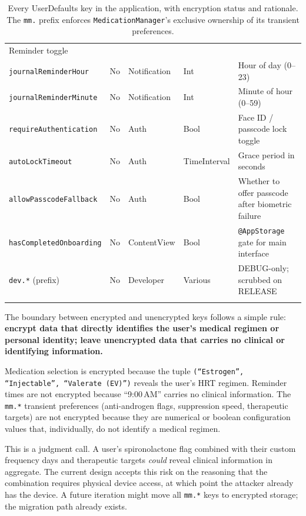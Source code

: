 \documentclass[11pt,a4paper]{article}
\newcommand{\code}[1]{\texttt{\small #1}}
\begin{document}
\begin{table}[h]
\begin{longtable}{@{}p{3.4cm}p{1.2cm}p{2.4cm}p{2.2cm}p{5.3cm}@{}}
  Reminder toggle \\
\code{journalReminderHour} & No & Notification & Int &
  Hour of day (0--23) \\
\code{journalReminderMinute} & No & Notification & Int &
  Minute of hour (0--59) \\
\midrule
\code{requireAuthentication} & No & Auth & Bool &
  Face ID / passcode lock toggle \\
\code{autoLockTimeout} & No & Auth & TimeInterval &
  Grace period in seconds \\
\code{allowPasscodeFallback} & No & Auth & Bool &
  Whether to offer passcode after biometric failure \\
\midrule
\code{hasCompletedOnboarding} & No & ContentView & Bool &
  \code{@AppStorage} gate for main interface \\
\code{dev.*} (prefix) & No & Developer & Various &
  DEBUG-only; scrubbed on RELEASE \\
\bottomrule
\caption{Every UserDefaults key in the application, with encryption status
and rationale. The \code{mm.} prefix enforces \code{MedicationManager}'s
exclusive ownership of its transient preferences.}
\label{tab:defaults_keys}
\end{longtable}
\end{table}

The boundary between encrypted and unencrypted keys follows a simple rule:
\textbf{encrypt data that directly identifies the user's medical
regimen or personal identity; leave unencrypted data that carries
no clinical or identifying information.}

Medication selection is encrypted because the tuple \code{(``Estrogen'',
``Injectable'', ``Valerate (EV)'')} reveals the user's HRT regimen.
Reminder times are not encrypted because ``9:00\,AM'' carries no clinical
information. The \code{mm.*} transient preferences (anti-androgen flags,
suppression speed, therapeutic targets) are not encrypted because they are
numerical or boolean configuration values that, individually, do not
identify a medical regimen.

This is a judgment call. A user's spironolactone flag combined with their
custom frequency days and therapeutic targets \emph{could} reveal
clinical information in aggregate. The current design accepts this risk on
the reasoning that the combination requires physical device access, at which
point the attacker already has the device. A future iteration might move all
\code{mm.*} keys to encrypted storage; the migration path already exists.
\end{document}
